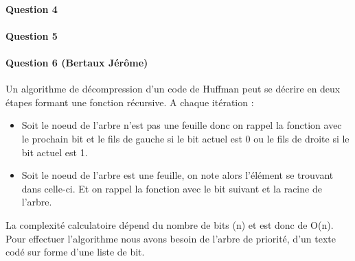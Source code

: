 \documentclass[a4paper]{article}
\begin{document}
\paragraph*{Question 4}
\paragraph*{Question 5}
\paragraph*{Question 6 (Bertaux Jérôme)}
Un algorithme de décompression d'un code de Huffman peut se décrire en deux étapes formant une fonction récursive. A chaque itération :
\begin{itemize}
\item Soit le noeud de l'arbre n'est pas une feuille donc on rappel la fonction avec le prochain bit et le fils de gauche si le bit actuel est 0 ou le fils de droite si le bit actuel est 1.
\item Soit le noeud de l'arbre est une feuille, on note alors l'élément se trouvant dans celle-ci. Et on rappel la fonction avec le bit suivant et la racine de l'arbre.
\end{itemize} 
La complexité calculatoire dépend du nombre de bits (n) et est donc de O(n). Pour effectuer l'algorithme nous avons besoin de l'arbre de priorité, d'un texte codé sur forme d'une liste de bit.
\end{document}
